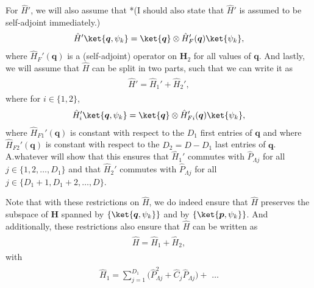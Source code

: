\documentclass{report}
\begin{document}
For $\hat H'$, we will also assume that %
*(I should also state that $\hat H'$ is assumed to be self-adjoint immediately.)
\begin{align}
\begin{aligned}
	\hat H' \ket{\boldsymbol{q}, \psi_{k}} = 
		\ket{\boldsymbol{q}} \otimes \hat H_F'(\boldsymbol{q}) \ket{\psi_{k}},
\end{aligned}
\end{align}
where $\hat H_F'(\boldsymbol{q})$ is a %
(self-adjoint) 
operator on $\textbf{H}_2$ for all values of $\boldsymbol{q}$. And lastly, we will assume that $\hat H$ can be split in two parts, %
such that we can write it as
\begin{align}
\begin{aligned}
	\hat H'  = \hat H_1' + \hat H_2',
\end{aligned}
\end{align}
where for $i\in\{1, 2\}$,
\begin{align}
\begin{aligned}
	\hat H_i' \ket{\boldsymbol{q}, \psi_{k}} = 
		\ket{\boldsymbol{q}} \otimes \hat H_{Fi}'(\boldsymbol{q}) \ket{\psi_{k}},
\end{aligned}
\end{align}
where $\hat H_{F1}'(\boldsymbol{q})$ is constant with respect to the $D_1$ first entries of $\boldsymbol{q}$ and where $\hat H_{F2}'(\boldsymbol{q})$ is constant with respect to the $D_2 = D - D_1$ last entries of $\boldsymbol{q}$. A.whatever will show that this ensures that $\hat H_1'$ commutes with $\hat P_{\Lambda j}$ for all $j\in\{1, 2, \ldots, D_1 \}$ and that $\hat H_2'$ commutes with $\hat P_{\Lambda j}$ for all $j\in\{D_1 +1, D_1 + 2, \ldots, D \}$. 


Note that with these restrictions on $\hat H$, we do indeed ensure that $\hat H$ preserves the subspace of \textbf{H} spanned by $\{\ket{\boldsymbol{q}, \psi_{k}}\}$ and by $\{\ket{\boldsymbol{p}, \psi_{k}}\}$. And additionally, these restrictions also ensure that $\hat H$ can be written as
\begin{align}
\begin{aligned}
	\hat H  = \hat H_1 + \hat H_2,
\end{aligned}
\end{align}
with
\begin{align}
\begin{aligned}
	\hat H_1  = \sum_{j=1}^{D_1} 
		\big( \hat P_{\Lambda j}^2 + \hat C_j \hat P_{\Lambda j} \big) + \,\,\ldots
\end{aligned}
\end{align}
\end{document}
